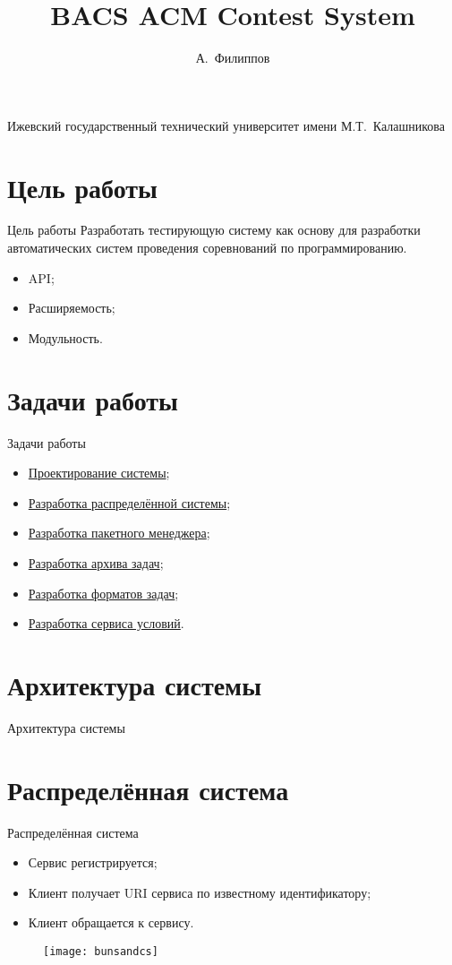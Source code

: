 \documentclass[xetex,mathserif,serif,10pt]{beamer}
\newenvironment{sframe}[2]{\section{#1}\begin{frame}[label=#2]{#1}}{\end{frame}}
\begin{document}
    \title[BACS]{BACS ACM Contest System}
    \author[Филиппов]{А.~Филиппов}
    \institute
    {
        Ижевский государственный технический университет имени М.Т.~Калашникова
    }
    \frame{\titlepage}

    

    \begin{sframe}{Цель работы}{target}
        Разработать тестирующую систему как основу для разработки
        автоматических систем проведения соревнований по программированию.

        \begin{itemize}
            \item API;
            \item Расширяемость;
            \item Модульность.
        \end{itemize}
    \end{sframe}

    \begin{sframe}{Задачи работы}{problems}
        \begin{itemize}
            \item \hyperlink{systemdesign}{Проектирование системы};
            \item \hyperlink{dcs}{Разработка распределённой системы};
            \item \hyperlink{bunsanpm}{Разработка пакетного менеджера};
            \item \hyperlink{bacsarchive}{Разработка архива задач};
            \item \hyperlink{bacsproblem}{Разработка форматов задач};
            \item \hyperlink{bacsstatementprovider}{Разработка сервиса условий}.
        \end{itemize}
    \end{sframe}

    \begin{sframe}{Архитектура системы}{systemdesign}
        \begin{figure}
            \resizebox{\columnwidth}{!}{
                
            }
        \end{figure}
    \end{sframe}

    \begin{sframe}{Распределённая система}{dcs}
        \begin{itemize}
            \item Сервис регистрируется;
            \item Клиент получает URI сервиса по известному идентификатору;
            \item Клиент обращается к сервису.
        \end{itemize}
        \begin{figure}
            \centering
            \texttt{[image: bunsandcs]}
        \end{figure}
    \end{sframe}
\end{document}
